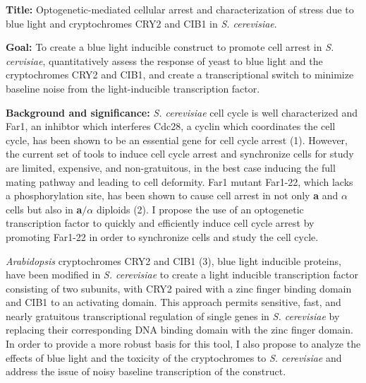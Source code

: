 \documentclass[12pt]{article}
\begin{document}

\textbf{Title:} Optogenetic-mediated cellular arrest and characterization of stress due to blue light and cryptochromes CRY2 and CIB1 in \emph{S. cerevisiae}. %

\textbf{Goal:} To create a blue light inducible construct to promote cell arrest in \emph{S. cervisiae}, quantitatively assess the response of yeast to blue light and the cryptochromes CRY2 and CIB1, and create a transcriptional switch to minimize baseline noise from the light-inducible transcription factor.

\textbf{Background and significance:} 
\emph{S. cerevisiae} cell cycle is well characterized and Far1, an inhibtor which interferes Cdc28, a cyclin which coordinates the cell cycle, has been shown to be an essential gene for cell cycle arrest (1). However, the current set of tools to induce cell cycle arrest and synchronize cells for study are limited, expensive, and non-gratuitous, in the best case inducing the full mating pathway and leading to cell deformity. Far1 mutant Far1-22, which lacks a phosphorylation site, has been shown to cause cell arrest in not only \textbf{a} and $\alpha$ cells but also in \textbf{a}$/\alpha$ diploids (2). I propose the use of an optogenetic transcription factor to quickly and efficiently induce cell cycle arrest by promoting Far1-22 in order to synchronize cells and study the cell cycle.

\emph{Arabidopsis} cryptochromes CRY2 and CIB1 (3), blue light inducible proteins, have been modified in \emph{S. cerevisiae} to create a light inducible transcription factor consisting of two subunits, with CRY2 paired with a zinc finger binding domain and CIB1 to an activating domain. This approach permits sensitive, fast, and nearly gratuitous transcriptional regulation of single genes in \emph{S. cerevisiae} by replacing their corresponding DNA binding domain with the zinc finger domain. In order to provide a more robust basis for this tool, I also propose to analyze the effects of blue light and the toxicity of the cryptochromes to \emph{S. cerevisiae} and address the issue of noisy baseline transcription of the construct.
\end{document}
